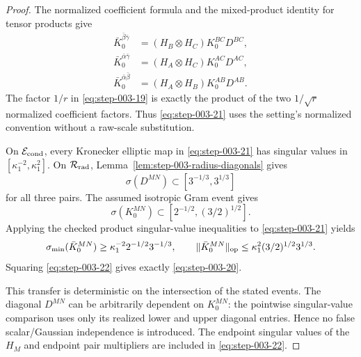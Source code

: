 \begin{proof}
The normalized coefficient formula and the mixed-product identity for tensor
products give
\begin{equation}
  \begin{aligned}
  \bar K_0^{\bar\beta\bar\gamma}
    &=(H_B\otimes H_C)K_0^{BC}D^{BC},\\
  \bar K_0^{\bar\alpha\bar\gamma}
    &=(H_A\otimes H_C)K_0^{AC}D^{AC},\\
  \bar K_0^{\bar\alpha\bar\beta}
    &=(H_A\otimes H_B)K_0^{AB}D^{AB}.
  \end{aligned}\label{eq:step-003-21}
\end{equation}
The factor \(1/r\) in \eqref{eq:step-003-19} is exactly the product of the two
\(1/\sqrt r\) normalized coefficient factors. Thus \eqref{eq:step-003-21} uses the setting's
normalized convention without a raw-scale substitution.

On \(\mathcal E_{\rm cond}\), every Kronecker elliptic map in \eqref{eq:step-003-21} has
singular values in \([\kappa_1^{-2},\kappa_1^2]\). On
\(\mathcal R_{\rm rad}\), Lemma~\ref{lem:step-003-radius-diagonals} gives
\[
  \sigma(D^{MN})\subset[3^{-1/3},3^{1/3}]
\]
for all three pairs. The assumed isotropic Gram event gives
\[
  \sigma(K_0^{MN})\subset[2^{-1/2},(3/2)^{1/2}].
\]
Applying the checked product singular-value inequalities to \eqref{eq:step-003-21} yields
\begin{equation}
  \sigma_{\min}(\bar K_0^{MN})
    \ge \kappa_1^{-2}2^{-1/2}3^{-1/3},
  \qquad
  \|\bar K_0^{MN}\|_{\rm op}
    \le \kappa_1^2(3/2)^{1/2}3^{1/3}.                      \label{eq:step-003-22}
\end{equation}
Squaring \eqref{eq:step-003-22} gives exactly \eqref{eq:step-003-20}.

This transfer is deterministic on the intersection of the stated events.
The diagonal \(D^{MN}\) can be arbitrarily dependent on \(K_0^{MN}\): the
pointwise singular-value comparison uses only its realized lower and upper
diagonal entries. Hence no false scalar/Gaussian independence is introduced.
The endpoint singular values of the \(H_M\) and endpoint pair multipliers are
included in \eqref{eq:step-003-22}. 

\end{proof}


